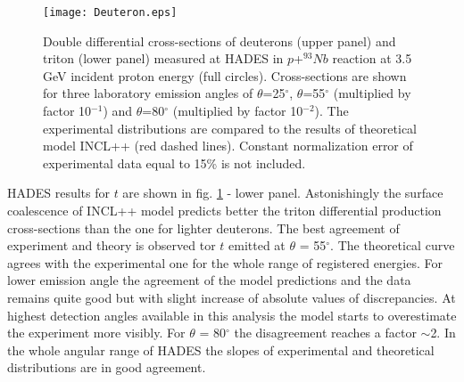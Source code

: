 \begin{figure}[!hbt]
	\centering
	\texttt{[image: Deuteron.eps]}%
	\caption{\label{d_t_m}	%
		Double differential cross-sections of deuterons (upper panel) and triton  (lower panel) measured at HADES in
		$p$+$^{93}Nb$ reaction at 3.5 GeV incident proton energy (full
		circles). Cross-sections are shown for three laboratory emission
		angles of $\theta$=25$^{\circ}$, $\theta$=55$^{\circ}$ (multiplied
		by factor 10$^{-1}$) and $\theta$=80$^{\circ}$ (multiplied by factor
		10$^{-2}$). The experimental distributions are compared to the
		results of theoretical model INCL++ (red dashed lines). Constant
		normalization error of experimental data equal to 15\% is not
		included. }
\end{figure}




HADES results for $t$ are shown in fig. \ref{d_t_m} - lower panel. Astonishingly the surface coalescence of INCL++ model predicts better the triton
differential production cross-sections than the one for lighter deuterons. The best agreement of experiment and theory is observed tor $t$ emitted at $\theta$ = 55$^{\circ}$. The theoretical curve
agrees with the experimental one for the whole range of registered energies. For lower emission angle the
agreement of the model predictions and the data remains quite good but with slight increase 
of absolute values of discrepancies. At highest detection angles available in this analysis the model starts to overestimate the experiment more visibly. For $\theta$ = 80$^{\circ}$ the disagreement reaches a factor $\sim$2. In the whole angular range of HADES the slopes of
experimental and theoretical distributions are in good agreement.


